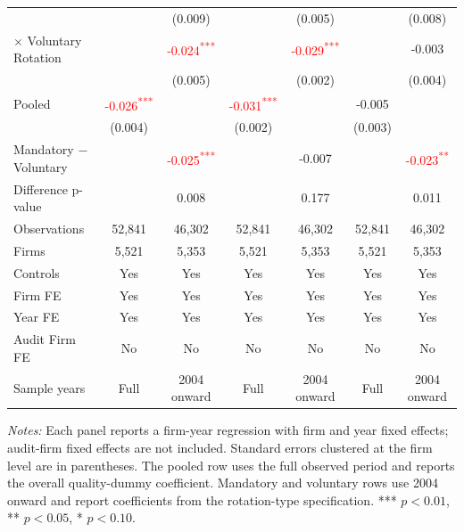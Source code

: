 \documentclass[10pt]{article}
\newcommand{\sym}[1]{\textsuperscript{#1}}
\begin{document}
\begin{minipage}{19cm}
\begin{threeparttable}
\begin{tabular}{l cc cc cc}
 &  & (0.009) &  & (0.005) &  & (0.008) \\
$\times$ Voluntary Rotation &  & \textcolor{red}{-0.024\sym{***}} &  & \textcolor{red}{-0.029\sym{***}} &  & -0.003 \\
 &  & (0.005) &  & (0.002) &  & (0.004) \\
Pooled & \textcolor{red}{-0.026\sym{***}} &  & \textcolor{red}{-0.031\sym{***}} &  & -0.005 &  \\
 & (0.004) &  & (0.002) &  & (0.003) &  \\
Mandatory $-$ Voluntary &  & \textcolor{red}{-0.025\sym{***}} &  & -0.007 &  & \textcolor{red}{-0.023\sym{**}} \\
Difference p-value &  & 0.008 &  & 0.177 &  & 0.011 \\
Observations & 52,841 & 46,302 & 52,841 & 46,302 & 52,841 & 46,302 \\
Firms & 5,521 & 5,353 & 5,521 & 5,353 & 5,521 & 5,353 \\
\midrule
Controls & Yes & Yes & Yes & Yes & Yes & Yes \\
Firm FE & Yes & Yes & Yes & Yes & Yes & Yes \\
Year FE & Yes & Yes & Yes & Yes & Yes & Yes \\
Audit Firm FE & No & No & No & No & No & No \\
Sample years & Full & 2004 onward & Full & 2004 onward & Full & 2004 onward \\
\bottomrule
\end{tabular}
\begin{tablenotes}\fontsize{9}{11}\selectfont
\item \fontsize{9}{11}\selectfont \textit{Notes:} Each panel reports a firm-year regression with firm and year fixed effects; audit-firm fixed effects are not included. Standard errors clustered at the firm level are in parentheses. The pooled row uses the full observed period and reports the overall quality-dummy coefficient. Mandatory and voluntary rows use 2004 onward and report coefficients from the rotation-type specification. *** \(p<0.01\), ** \(p<0.05\), * \(p<0.10\).
\end{tablenotes}
\end{threeparttable}

\end{minipage}
\end{document}
